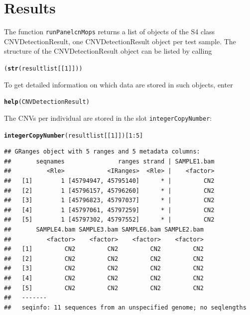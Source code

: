 \documentclass[article]{bioinf}\usepackage[]{graphicx}\usepackage[]{color}
\makeatletter
\newcommand{\hlnum}[1]{\textcolor[rgb]{0.686,0.059,0.569}{#1}}%
\newcommand{\hlopt}[1]{\textcolor[rgb]{0,0,0}{#1}}%
\newcommand{\hlstd}[1]{\textcolor[rgb]{0.345,0.345,0.345}{#1}}%
\newcommand{\hlkwd}[1]{\textcolor[rgb]{0.737,0.353,0.396}{\textbf{#1}}}%
\newenvironment{kframe}{%
 \def\at@end@of@kframe{}%
 \ifinner\ifhmode%
  \def\at@end@of@kframe{\end{minipage}}%
  \begin{minipage}{\columnwidth}%
 \fi\fi%
 \def\FrameCommand##1{\hskip\@totalleftmargin \hskip-\fboxsep
 \colorbox{shadecolor}{##1}\hskip-\fboxsep
     \hskip-\linewidth \hskip-\@totalleftmargin \hskip\columnwidth}%
 \MakeFramed {\advance\hsize-\width
   \@totalleftmargin\z@ \linewidth\hsize
   \@setminipage}}%
 {\par\unskip\endMakeFramed%
 \at@end@of@kframe}
\newenvironment{knitrout}{}{} %
\makeatother
\begin{document}
\section{Results}
\label{s:results}
The function \verb+runPanelcnMops+ returns a list of objects of the S4 class 
CNVDetectionResult, one CNVDetectionResult object per test sample. 
The structure of the CNVDetectionResult object can be listed by calling
\begin{knitrout}
\color{fgcolor}\begin{kframe}
\begin{alltt}
\hlstd{(}\hlkwd{str}\hlstd{(resultlist[[}\hlnum{1}\hlstd{]]))}
\end{alltt}
\end{kframe}
\end{knitrout}

To get
detailed information on which data are stored in such objects, enter
\begin{knitrout}
\color{fgcolor}\begin{kframe}
\begin{alltt}
\hlkwd{help}\hlstd{(CNVDetectionResult)}
\end{alltt}
\end{kframe}
\end{knitrout}



The CNVs per individual are stored in the slot \verb+integerCopyNumber+:
\begin{knitrout}
\color{fgcolor}\begin{kframe}
\begin{alltt}
\hlkwd{integerCopyNumber}\hlstd{(resultlist[[}\hlnum{1}\hlstd{]])[}\hlnum{1}\hlopt{:}\hlnum{5}\hlstd{]}
\end{alltt}
\begin{verbatim}
## GRanges object with 5 ranges and 5 metadata columns:
##       seqnames               ranges strand | SAMPLE1.bam
##          <Rle>            <IRanges>  <Rle> |    <factor>
##   [1]        1 [45794947, 45795140]      * |         CN2
##   [2]        1 [45796157, 45796260]      * |         CN2
##   [3]        1 [45796823, 45797037]      * |         CN2
##   [4]        1 [45797061, 45797259]      * |         CN2
##   [5]        1 [45797302, 45797552]      * |         CN2
##       SAMPLE4.bam SAMPLE3.bam SAMPLE6.bam SAMPLE2.bam
##          <factor>    <factor>    <factor>    <factor>
##   [1]         CN2         CN2         CN2         CN2
##   [2]         CN2         CN2         CN2         CN2
##   [3]         CN2         CN2         CN2         CN2
##   [4]         CN2         CN2         CN2         CN2
##   [5]         CN2         CN2         CN2         CN2
##   -------
##   seqinfo: 11 sequences from an unspecified genome; no seqlengths
\end{verbatim}
\end{kframe}
\end{knitrout}
\end{document}
